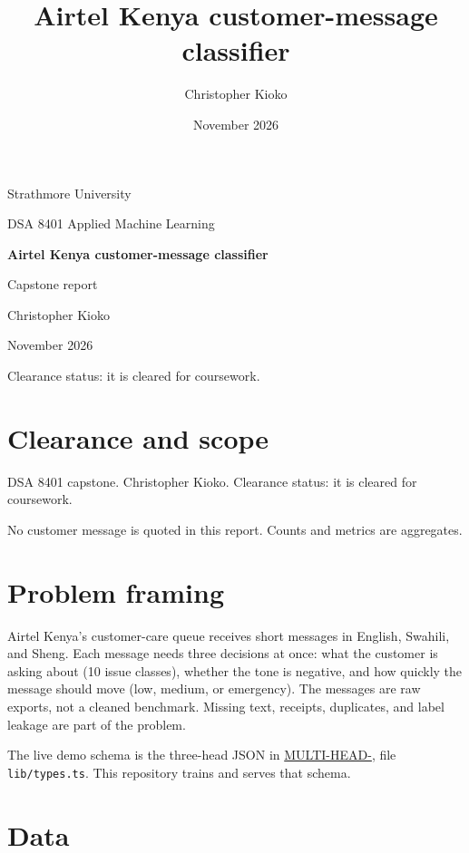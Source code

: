 \documentclass[11pt,a4paper]{article}
\title{Airtel Kenya customer-message classifier}
\author{Christopher Kioko}
\date{November 2026}
\begin{document}
\begin{titlepage}
  \centering
  \vspace*{2.2cm}
  {\Large Strathmore University\par}
  \vspace{0.9cm}
  {\large DSA 8401 Applied Machine Learning\par}
  \vspace{2.2cm}
  {\Huge\bfseries Airtel Kenya customer-message classifier\par}
  \vspace{0.8cm}
  {\large Capstone report\par}
  \vspace{2.4cm}
  {\Large Christopher Kioko\par}
  \vspace{0.6cm}
  {\large November 2026\par}
  \vfill
  {\large Clearance status: it is cleared for coursework.\par}
  \vspace{0.8cm}
\end{titlepage}

\section*{Clearance and scope}

DSA 8401 capstone. Christopher Kioko. Clearance status: it is cleared for coursework.

No customer message is quoted in this report. Counts and metrics are aggregates.

\section{Problem framing}

Airtel Kenya's customer-care queue receives short messages in English, Swahili, and Sheng. Each message needs three decisions at once: what the customer is asking about (10 issue classes), whether the tone is negative, and how quickly the message should move (low, medium, or emergency). The messages are raw exports, not a cleaned benchmark. Missing text, receipts, duplicates, and label leakage are part of the problem.

The live demo schema is the three-head JSON in \href{https://github.com/ChristopherKiokoStrathmore/MULTI-HEAD-}{MULTI-HEAD-}, file \texttt{lib/\allowbreak{}types.ts}. This repository trains and serves that schema.

\section{Data}
\end{document}
